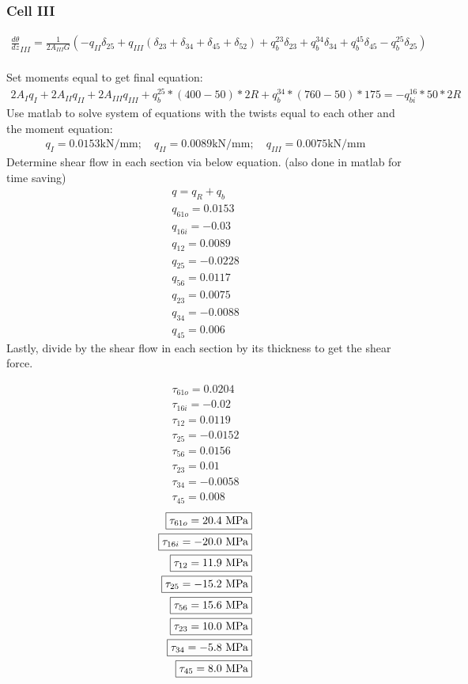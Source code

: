 \documentclass[12 pt]{article}
\begin{document}
\subsubsection*{Cell III}
\begin{align*}
    \frac{d\theta}{dz}_{III}=\frac{1}{2A_{III}G}(-q_{II}\delta_{25}+q_{III}(\delta_{23}+\delta_{34}+\delta_{45}+\delta_{52})
    +q_b^{23}\delta_{23}+q_b^{34}\delta_{34}+q_b^{45}\delta_{45}-q_b^{25}\delta_{25})
\end{align*} \\
Set moments equal to get final equation:
\begin{align*}
    2A_Iq_I+2A_{II}q_{II}+2A_{III}q_{III}+q_b^{25}*(400-50)*2R+q_b^{34}*(760-50)*175=-q_{bi}^{16}*50*2R
\end{align*}
Use matlab to solve system of equations with the twists equal to each other and the moment equation:
\begin{align*}
    q_I=0.0153 \textrm{kN/mm};\quad
    q_{II}=0.0089 \textrm{kN/mm};\quad
    q_{III}=0.0075 \textrm{kN/mm}
\end{align*}
Determine shear flow in each section via below equation. (also done in matlab for time saving)
\begin{align*}
    q=q_R+q_b \\
    q_{61o}=0.0153 \\
    q_{16i}=-0.03 \\
    q_{12}=0.0089 \\
    q_{25}=-0.0228 \\
    q_{56}=0.0117 \\
    q_{23}=0.0075 \\
    q_{34}=-0.0088 \\
    q_{45}=0.006
\end{align*}
Lastly, divide by the shear flow in each section by its thickness to get the shear force.
\begin{paracol}{2}
    \begin{align*}
        \tau_{61o}=0.0204 \\
        \tau_{16i}=-0.02 \\
        \tau_{12}=0.0119 \\
        \tau_{25}=-0.0152 \\
        \tau_{56}=0.0156 \\
        \tau_{23}=0.01 \\
        \tau_{34}=-0.0058 \\
        \tau_{45}=0.008
    \end{align*}
    \switchcolumn
    \begin{align*}
        \fbox{$\tau_{61o}=20.4$ MPa} \\
        \fbox{$\tau_{16i}=-20.0$ MPa} \\
        \fbox{$\tau_{12}=11.9$ MPa} \\
        \fbox{$\tau_{25}=-15.2$ MPa} \\
        \fbox{$\tau_{56}=15.6$ MPa} \\
        \fbox{$\tau_{23}=10.0$ MPa} \\
        \fbox{$\tau_{34}=-5.8$ MPa} \\
        \fbox{$\tau_{45}=8.0$ MPa}
    \end{align*}
\end{paracol}
\end{document}
